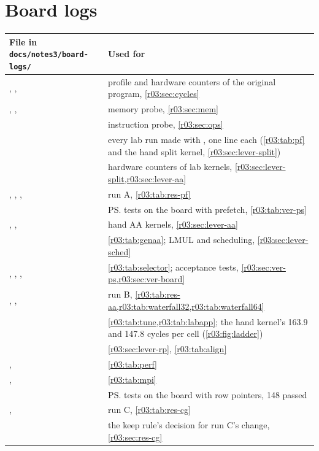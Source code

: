 \section*{Board logs}
\begin{xltabular}{\linewidth}{@{}>{\raggedright\arraybackslash}p{6.4cm}>{\raggedright\arraybackslash}X@{}}
  \toprule
  \textbf{File in \texttt{docs/notes3/board-logs/}} & \textbf{Used for}\\
  \midrule
  \endhead
  , ,
     & profile and hardware counters of the original program,
    \cref{r03:sec:cycles}\\
  , ,  & memory
    probe, \cref{r03:sec:mem}\\
   & instruction probe, \cref{r03:sec:ops}\\
   & every lab run made with , one line each
    (\cref{r03:tab:pf} and the hand split kernel, \cref{r03:sec:lever-split})\\
   & hardware counters of lab kernels, \cref{r03:sec:lever-split,r03:sec:lever-aa}\\
  , , ,
     & run A, \cref{r03:tab:res-pf}\\
   & \ps{} tests on the board with prefetch, \cref{r03:tab:ver-ps}\\
  , ,  & hand AA kernels,
    \cref{r03:sec:lever-aa}\\
   & \cref{r03:tab:genaa}; LMUL and scheduling, \cref{r03:sec:lever-sched}\\
  , , ,  &
    \cref{r03:tab:selector}; acceptance tests, \cref{r03:sec:ver-ps,r03:sec:ver-board}\\
  , ,  &
    run B, \cref{r03:tab:res-aa,r03:tab:waterfall32,r03:tab:waterfall64}\\
   & \cref{r03:tab:tune,r03:tab:labapp}; the hand kernel's 163.9 and 147.8 cycles
    per cell (\cref{r03:fig:ladder})\\
   & \cref{r03:sec:lever-rp}, \cref{r03:tab:align}\\
  ,  & \cref{r03:tab:perf}\\
  ,  & \cref{r03:tab:mpi}\\
   & \ps{} tests on the board with row pointers, 148 passed\\
  ,  & run C, \cref{r03:tab:res-cg}\\
   & the keep rule's decision for run C's change, \cref{r03:sec:res-cg}\\
  \bottomrule
\end{xltabular}

